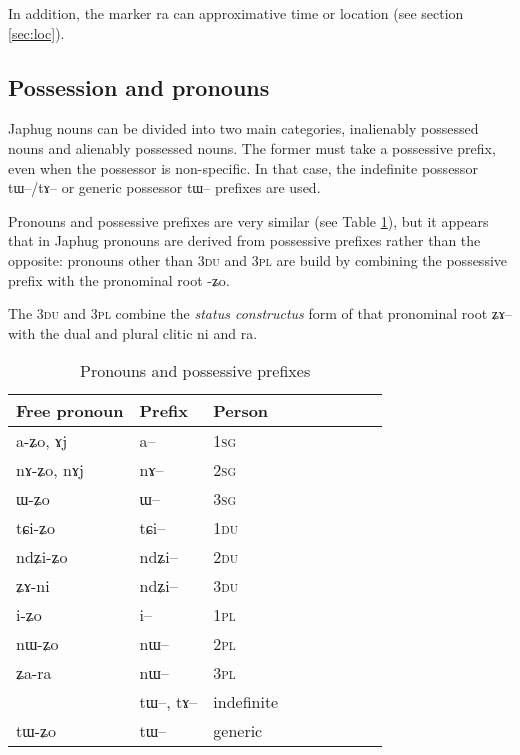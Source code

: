 \documentclass[oldfontcommands,oneside,a4paper,11pt]{article}
\newcommand{\ipa}[1]{{\phon #1}} %
\begin{document}
In addition, the marker \ipa{ra} can approximative time or location  (see section  \ref{sec:loc}).
 


 \subsection{Possession and pronouns} 
Japhug  nouns can be divided into two main categories, inalienably possessed nouns and alienably possessed nouns. The former must take a possessive prefix, even when the possessor is non-specific. In that case, the indefinite possessor \ipa{tɯ--/tɤ--} or generic possessor \ipa{tɯ--} prefixes are used.

Pronouns  and possessive prefixes are very similar (see Table \ref{tab:pronoun}), but it appears that in Japhug pronouns are derived from possessive prefixes rather than the opposite: pronouns other than \textsc{3du} and \textsc{3pl} are build by combining the possessive prefix with the pronominal root \ipa{-ʑo}.  

The \textsc{3du} and \textsc{3pl} combine the \textit{status constructus} form of that pronominal root \ipa{ʑɤ--} with the dual and plural clitic \ipa{ni} and \ipa{ra}.
 
 
\begin{table}[H] \centering
\caption{Pronouns and possessive prefixes }\label{tab:pronoun}
\begin{tabular}{lllllllll} 
\toprule
 Free pronoun & Prefix & Person\\
\midrule
 \ipa{a-ʑo},    \ipa{ɤj} &	\ipa{a--}  &		1\textsc{sg} \\
\ipa{nɤ-ʑo},  \ipa{nɤj} &	\ipa{nɤ--}  &			2\textsc{sg}\\
\ipa{ɯ-ʑo}  &	\ipa{ɯ--}  &			3\textsc{sg}\\
\midrule
\ipa{tɕi-ʑo}  &	\ipa{tɕi--}  &			1\textsc{du} \\
\ipa{ndʑi-ʑo}  &	\ipa{ndʑi--}  &		2\textsc{du} \\	
\ipa{ʑɤ-ni}  &	\ipa{ndʑi--}  &		3\textsc{du} \\	
\midrule
\ipa{i-ʑo}    &	\ipa{i--}  &			1\textsc{pl} \\
\ipa{nɯ-ʑo}   &	\ipa{nɯ--}  &			2\textsc{pl} \\
\ipa{ʑa-ra}  &	\ipa{nɯ--}  &			3\textsc{pl} \\
\midrule
&  \ipa{tɯ--},  \ipa{tɤ--} & indefinite \\
\ipa{tɯ-ʑo} & \ipa{tɯ--}   &  generic\\
\bottomrule
\end{tabular}
\end{table}
 
\end{document}
